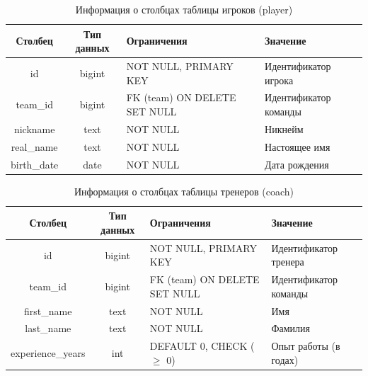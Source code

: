 \begin{table}[H]
	\begin{center}
		\caption{Информация о столбцах таблицы игроков (player)}
		\begin{tabular}{|c|c|>{\centering\arraybackslash}m{5cm}|>{\centering\arraybackslash}m{3.5cm}|}
			\hline
			Столбец & Тип данных & Ограничения & Значение \\
			\hline
			id & bigint & NOT NULL, PRIMARY KEY & Идентификатор игрока \\
			\hline
			team\_id & bigint & FK (team) ON DELETE SET NULL & Идентификатор команды \\
			\hline
			nickname & text & NOT NULL & Никнейм \\
			\hline
			real\_name & text & NOT NULL & Настоящее имя \\
			\hline
			birth\_date & date & NOT NULL & Дата рождения \\
			\hline
		\end{tabular}
		\label{table:db:player}
	\end{center}
\end{table}

\begin{table}[H]
	\begin{center}
		\caption{Информация о столбцах таблицы тренеров (coach)}
		\begin{tabular}{|c|c|>{\centering\arraybackslash}m{5cm}|>{\centering\arraybackslash}m{3.5cm}|}
			\hline
			Столбец & Тип данных & Ограничения & Значение \\
			\hline
			id & bigint & NOT NULL, PRIMARY KEY & Идентификатор тренера \\
			\hline
			team\_id & bigint & FK (team) ON DELETE SET NULL & Идентификатор команды \\
			\hline
			first\_name & text & NOT NULL & Имя \\
			\hline
			last\_name & text & NOT NULL & Фамилия \\
			\hline
			experience\_years & int & DEFAULT 0, CHECK ($\ge$ 0) & Опыт работы (в годах) \\
			\hline
		\end{tabular}
		\label{table:db:coach}
	\end{center}
\end{table}


